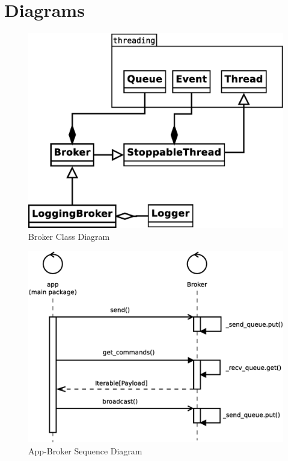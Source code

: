 \documentclass{article}
\begin{document}
\section{Diagrams}
\begin{figure}[H]
	\centering
	\includegraphics[width=\linewidth]{diagrams/BrokerDiagram.eps}
	\caption{Broker Class Diagram}
\end{figure}

\begin{figure}[H]
	\centering
	\includegraphics[width=\linewidth]{diagrams/AppBrokerSequenceDiagram.eps}
	\caption{App-Broker Sequence Diagram}
\end{figure}
\end{document}
